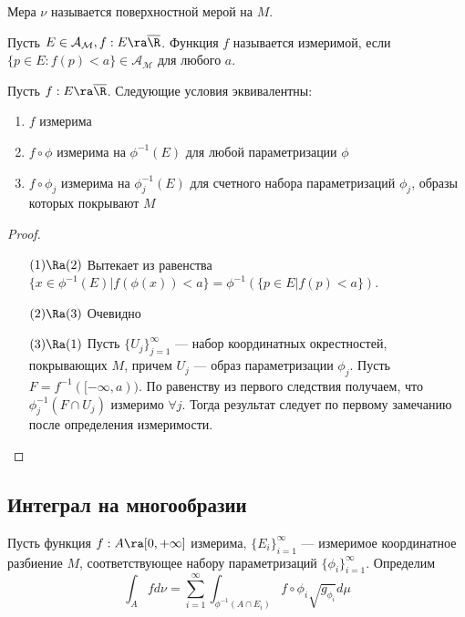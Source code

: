 \begin{definition}
    Мера \(\nu\) называется поверхностной мерой на \(M\). 
\end{definition}

\begin{definition}
    Пусть \(E \in \mathcal{A_M}, f: E \ra \overline{\R}\). Функция \(f\) называется измеримой, если \(\{p \in E: f(p) < a\} \in \mathcal{A_M}\) для любого \(a\).
\end{definition}

\begin{lemma}
    Пусть \(f: E \ra \overline{\R}\). Следующие условия эквивалентны:
    \begin{enumerate}
        \item \(f\) измерима
        \item \(f \circ \phi\) измерима на \(\phi^{-1}(E)\) для любой параметризации \(\phi\)
        \item \(f \circ \phi_j\) измерима на \(\phi_j^{-1}(E)\) для счетного набора параметризаций \(\phi_j\), образы которых покрывают \(M\)
    \end{enumerate}
\end{lemma}
\begin{proof}\indent
    \begin{enumerate}
        \item[\((1) \Ra (2)\)] Вытекает из равенства \(\{x \in \phi^{-1}(E) | f(\phi(x)) < a\} = \phi^{-1}(\{p \in E | f(p) < a\})\).
        \item[\((2) \Ra (3)\)] Очевидно
        \item[\((3) \Ra (1)\)] Пусть \(\{U_j\}_{j = 1}^\infty\) --- набор координатных окрестностей, покрывающих \(M\), причем \(U_j\) --- образ параметризации \(\phi_j\). Пусть \(F = f^{-1}([-\infty, a))\). По равенству из первого следствия получаем, что \(\phi^{-1}_j(F \cap U_j)\) измеримо \(\forall j\). Тогда результат следует по первому замечанию после определения измеримости.
    \end{enumerate}
\end{proof}
\subsection{Интеграл на многообразии}
\begin{definition}
    Пусть функция \(f: A \ra [0, +\infty]\) измерима, \(\{E_i\}_{i = 1}^\infty\) --- измеримое координатное разбиение \(M\), соответствующее набору параметризаций \(\{\phi_i\}_{i = 1}^\infty\). Определим
    \[\int_A fd\nu = \sum_{i = 1}^\infty \int_{\phi^{-1}(A \cap E_i)} f \circ \phi_i \sqrt{g_{\phi_i}}d\mu\]
\end{definition}

